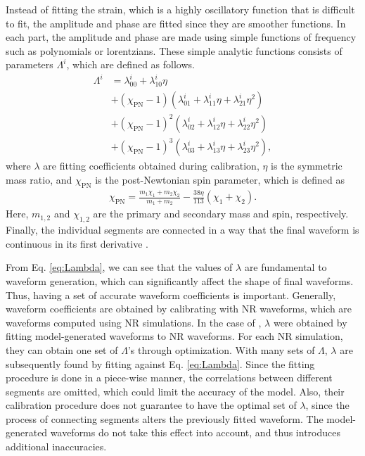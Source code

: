 \documentclass[twocolumn]{aastex631}
\begin{document}
Instead of fitting the strain, which is a highly oscillatory function that is
difficult to fit, the amplitude and phase are fitted since they are smoother
functions. In each part, the amplitude and phase are made using simple functions
of frequency such as polynomials or lorentzians. These simple analytic functions
consists of parameters $\Lambda^i$, which are defined as follows. 
\begin{align} \label{eq:Lambda}
	\Lambda^i&=\lambda_{00}^i+\lambda_{10}^i\eta \nonumber \\
	&+(\chi_{\mathrm{PN}}-1)(\lambda_{01}^i+\lambda_{11}^i\eta+\lambda_{21}^i\eta^2) \nonumber \\ 
	&+(\chi_{\mathrm{PN}}-1)^2(\lambda_{02}^i+\lambda_{12}^i\eta+\lambda_{22}^i\eta^2) \nonumber \\
	&+(\chi_{\mathrm{PN}}-1)^3(\lambda_{03}^i+\lambda_{13}^i\eta+\lambda_{23}^i\eta^2),
\end{align}
where $\lambda$ are fitting coefficients obtained during calibration, $\eta$ is
the symmetric mass ratio, and $\chi_{\mathrm{PN}}$ is the post-Newtonian spin
parameter, which is defined as 
\begin{align}
	\chi_{\mathrm{PN}}=\frac{m_1\chi_1+m_2\chi_2}{m_1+m_2}-\frac{38\eta}{113}(\chi_1+\chi_2).
\end{align}
Here, $m_{1,2}$ and $\chi_{1,2}$ are the primary and secondary mass and spin,
respectively. Finally, the individual segments are connected in a way that the
final waveform is continuous in its first derivative .

From Eq. \ref{eq:Lambda}, we can see that the values of $\lambda$ are
fundamental to waveform generation, which can significantly affect the shape of
final waveforms. Thus, having a set of accurate waveform coefficients is
important. Generally, waveform coefficients are obtained by calibrating with NR
waveforms, which are waveforms computed using NR simulations. In the case of
\citep{khan2016frequency}, $\lambda$ were obtained by fitting model-generated
waveforms to NR waveforms. For each NR simulation, they can obtain one set of
$\Lambda$'s through optimization. With many sets of $\Lambda$, $\lambda$ are
subsequently found by fitting against Eq. \ref{eq:Lambda}. Since the fitting
procedure is done in a piece-wise manner, the correlations between different
segments are omitted, which could limit the accuracy of the model. Also,
their calibration procedure does not guarantee to have the optimal set of
$\lambda$, since the process of connecting segments alters the previously fitted
waveform. The model-generated waveforms do not take this effect into account,
and thus introduces additional inaccuracies. 
\end{document}
